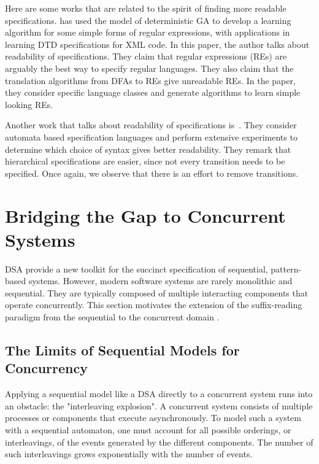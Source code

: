 Here are some works that are related to the spirit of finding more readable specifications. \cite{fernau2009algorithms} has used the model of deterministic GA to
develop a learning algorithm for some simple forms of regular
expressions, with
applications in learning DTD specifications for XML code. In this
paper, the author talks about readability of specifications. They
claim that regular expressions (REs) are arguably the best way to
specify regular 
languages. They also claim that the translation algorithms from DFAs
to REs give unreadable REs. In the paper, they consider specific
language classes and generate algorithms to learn simple looking REs.

Another work that talks about readability of specifications
is~\cite{DBLP:conf/icse/ZimmermanLL02}. They consider automata based
specification languages and perform extensive
experiments to determine which choice of syntax gives better
readability. They remark that hierarchical specifications are easier,
since not every transition needs to be specified. Once again, we
observe that there is an effort to remove transitions. %



\section{Bridging the Gap to Concurrent Systems}
DSA provide a new toolkit for the succinct specification of sequential, pattern-based systems. However, modern software systems are rarely monolithic and sequential. They are typically composed of multiple interacting components that operate concurrently. This section motivates the extension of the suffix-reading paradigm from the sequential to the concurrent domain \cite{Keerthan2025netys}.

\subsection*{The Limits of Sequential Models for Concurrency}
Applying a sequential model like a DSA directly to a concurrent system runs into an obstacle: the "interleaving explosion". A concurrent system consists of multiple processes or components that execute asynchronously. To model such a system with a sequential automaton, one must account for all possible orderings, or interleavings, of the events generated by the different components. The number of such interleavings grows exponentially with the number of events.


